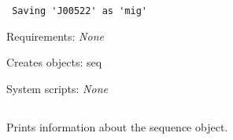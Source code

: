 \begin{description}
\begin{enumerate}
\begin{verbatim}
 Saving 'J00522' as 'mig'

\end{verbatim}

\end{enumerate}


\item{Requirements:} {\em None}


\item{Creates objects:} seq


\item{System scripts:} {\em None}

\end{description}



\subsection[seq\_info]{  }



Prints information about the sequence object.


